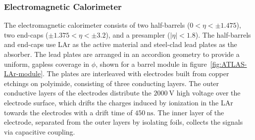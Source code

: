 \subsubsection{Electromagnetic Calorimeter}\label{sec:ATLAS-calorimeters-ecal}
The electromagnetic calorimeter consists of two half-barrels ($0<\eta<\pm1.475$), two end-caps ($\pm1.375<\eta<\pm3.2$), and a presampler ($|\eta|<1.8$). The half-barrels and end-caps use LAr as the active material and steel-clad lead plates as the absorber. The lead plates are arranged in an accordion geometry to provide a uniform, gapless coverage in $\phi$, shown for a barrel module in figure~\ref{fig:ATLAS-LAr-module}. The plates are interleaved with electrodes built from copper etchings on polyimide, consisting of three conducting layers. The outer conductive layers of the electrodes distribute the $\SI{2000}{\volt}$ high voltage over the electrode surface, which drifts the charges induced by ionization in the LAr towards the electrodes with a drift time of $\SI{450}{\nano\second}$. The inner layer of the electrode, separated from the outer layers by isolating foils, collects the signals via capacitive coupling. 

